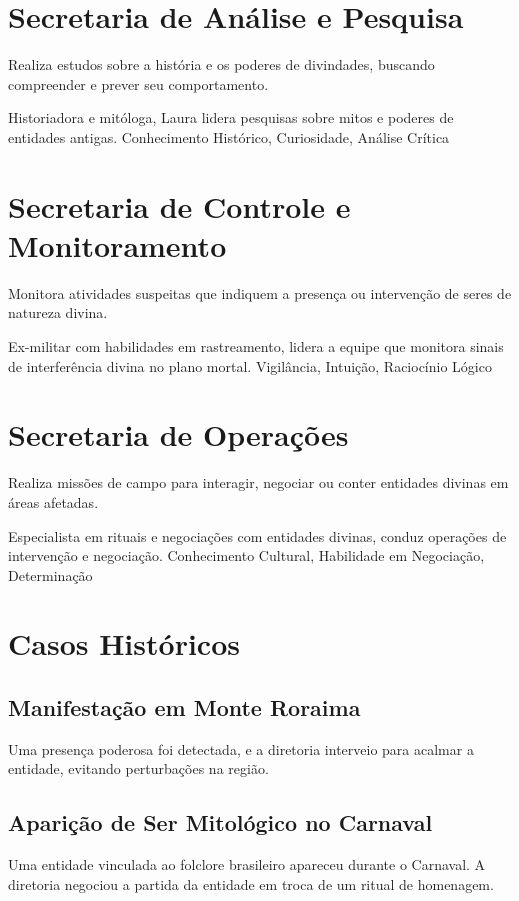\section{Secretaria de Análise e Pesquisa}
Realiza estudos sobre a história e os poderes de divindades, buscando compreender e prever seu comportamento.

{Historiadora e mitóloga, Laura lidera pesquisas sobre mitos e poderes de entidades antigas.}
{Conhecimento Histórico, Curiosidade, Análise Crítica}

\section{Secretaria de Controle e Monitoramento}
Monitora atividades suspeitas que indiquem a presença ou intervenção de seres de natureza divina.

{Ex-militar com habilidades em rastreamento, lidera a equipe que monitora sinais de interferência divina no plano mortal.}
{Vigilância, Intuição, Raciocínio Lógico}

\section{Secretaria de Operações}
Realiza missões de campo para interagir, negociar ou conter entidades divinas em áreas afetadas.

{Especialista em rituais e negociações com entidades divinas, conduz operações de intervenção e negociação.}
{Conhecimento Cultural, Habilidade em Negociação, Determinação}

\section{Casos Históricos}

\subsection{Manifestação em Monte Roraima} Uma presença poderosa foi detectada, e a diretoria interveio para acalmar a entidade, evitando perturbações na região.

\subsection{Aparição de Ser Mitológico no Carnaval} Uma entidade vinculada ao folclore brasileiro apareceu durante o Carnaval. A diretoria negociou a partida da entidade em troca de um ritual de homenagem.

